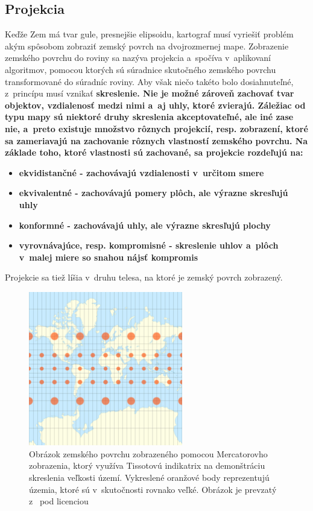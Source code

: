\subsection*{Projekcia}
Keďže Zem má tvar gule, presnejšie elipsoidu, kartograf musí vyriešiť problém akým spôsobom zobraziť zemský povrch na dvojrozmernej mape. Zobrazenie zemského povrchu do roviny sa nazýva projekcia a~spočíva v~aplikovaní algoritmov, pomocou ktorých sú súradnice skutočného zemského povrchu transformované do súradníc roviny. Aby však niečo takéto bolo dosiahnuteľné, z~princípu musí vznikať \bf skreslenie\rm. Nie je možné zároveň zachovať tvar objektov, vzdialenosť medzi nimi a~aj uhly, ktoré zvierajú. Záležiac od typu mapy sú niektoré druhy skreslenia akceptovateľné, ale iné zase nie, a~preto existuje množstvo rôznych projekcií, resp. zobrazení, ktoré sa zameriavajú na zachovanie rôznych vlastností zemského povrchu. Na základe toho, ktoré vlastnosti sú zachované, sa projekcie rozdeľujú na:
\begin{itemize}
  \item{\bf ekvidistančné \rm - zachovávajú vzdialenosti v~určitom smere}
  \item{\bf ekvivalentné \rm - zachovávajú pomery plôch, ale výrazne skresľujú uhly}
  \item{\bf konformné \rm - zachovávajú uhly, ale výrazne skresľujú plochy}
  \item{\bf vyrovnávajúce, resp. kompromisné \rm - skreslenie uhlov a~plôch v~malej miere so snahou nájsť kompromis}
\end{itemize}
Projekcie sa tiež líšia v~druhu telesa, na ktoré je zemský povrch zobrazený. 

\begin{figure}[hbt]
	\centering
	\includegraphics[width=0.6\textwidth]{obrazky-figures/mercator.pdf}
	\caption{Obrázok zemského povrchu zobrazeného pomocou Mercatorovho zobrazenia, ktorý využíva Tissotovú indikatrix na demonštráciu skreslenia veľkosti území. Vykreslené oranžové body reprezentujú územia, ktoré sú v~skutočnosti rovnako veľké. Obrázok je prevzatý z~\cite{mercator} pod licenciou\protect\footnotemark}
	\label{img_mercator}
\end{figure}

